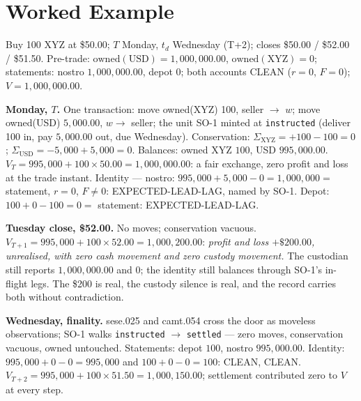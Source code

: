 \documentclass[11pt]{article}
\begin{document}
\section{Worked Example}

Buy 100 XYZ at \$50.00; $T$ Monday, $t_d$ Wednesday (T+2); closes \$50.00 /
\$52.00 / \$51.50. Pre-trade: $\mathrm{owned}(\mathrm{USD}) = 1{,}000{,}000.00$,
$\mathrm{owned}(\mathrm{XYZ}) = 0$; statements: nostro $1{,}000{,}000.00$, depot
$0$; both accounts CLEAN ($r=0$, $F=0$); $V = 1{,}000{,}000.00$.

\textbf{Monday, $T$.} One transaction: move owned(XYZ) 100, seller $\to$ $w$; move
owned(USD) $5{,}000.00$, $w \to$ seller; the unit SO-1 minted at
\texttt{instructed} (deliver 100 in, pay $5{,}000.00$ out, due Wednesday).
Conservation: $\Sigma_{\mathrm{XYZ}} = +100 - 100 = 0$;
$\Sigma_{\mathrm{USD}} = -5{,}000 + 5{,}000 = 0$. Balances: owned XYZ $100$, USD
$995{,}000.00$. $V_T = 995{,}000 + 100 \times 50.00 = 1{,}000{,}000.00$: a fair
exchange, zero profit and loss at the trade instant. Identity --- nostro:
$995{,}000 + 5{,}000 - 0 = 1{,}000{,}000 = $ statement, $r=0$, $F \neq 0$:
EXPECTED-LEAD-LAG, named by SO-1. Depot: $100 + 0 - 100 = 0 = $ statement:
EXPECTED-LEAD-LAG.

\textbf{Tuesday close, \$52.00.} No moves; conservation vacuous.
$V_{T+1} = 995{,}000 + 100 \times 52.00 = 1{,}000{,}200.00$: \emph{profit and loss
$+\$200.00$, unrealised, with zero cash movement and zero custody movement.} The
custodian still reports $1{,}000{,}000.00$ and $0$; the identity still balances
through SO-1's in-flight legs. The \$200 is real, the custody silence is real, and
the record carries both without contradiction.

\textbf{Wednesday, finality.} sese.025 and camt.054 cross the door as moveless
observations; SO-1 walks \texttt{instructed} $\to$ \texttt{settled} --- zero moves,
conservation vacuous, owned untouched. Statements: depot $100$, nostro
$995{,}000.00$. Identity: $995{,}000 + 0 - 0 = 995{,}000$ and $100 + 0 - 0 = 100$:
CLEAN, CLEAN. $V_{T+2} = 995{,}000 + 100 \times 51.50 = 1{,}000{,}150.00$;
settlement contributed zero to $V$ at every step.
\end{document}
